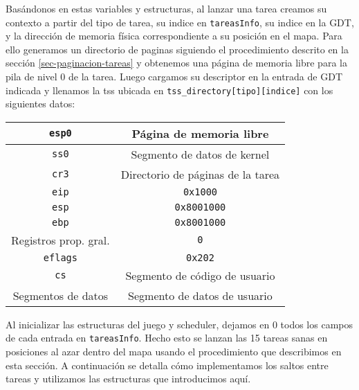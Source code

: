 Basándonos en estas variables y estructuras, al lanzar una tarea creamos su contexto a partir del tipo de tarea, su indice en \verb|tareasInfo|, su indice en la GDT, y la dirección de memoria física correspondiente a su posición en el mapa. 
Para ello generamos un directorio de paginas siguiendo el procedimiento descrito en la sección \ref{sec-paginacion-tareas} y obtenemos una página de memoria libre para la pila de nivel 0 de la tarea. Luego cargamos su descriptor en la entrada de GDT indicada y llenamos la tss ubicada en \verb|tss_directory[tipo][indice]| con los siguientes datos:\\


\begin{center}
	\begin{tabular}{ |c| c | }
		\hline
		\verb|esp0| & Página de memoria libre\\
		\hline
		\verb|ss0|  & Segmento de datos de kernel\\
		\hline
		\verb|cr3|  & Directorio de páginas de la tarea\\
		\hline
		\verb|eip|  & \verb|0x1000|\\
		\hline
		\verb|esp|  & \verb|0x8001000|\\
		\hline
		\verb|ebp|  & \verb|0x8001000|\\
		\hline
		Registros prop. gral. & \verb|0|\\
		\hline
		\verb|eflags| & \verb|0x202|\\
		\hline
		\verb|cs| & Segmento de código de usuario\\
		\hline
		Segmentos de datos & Segmento de datos de usuario\\
		\hline
	\end{tabular}
\end{center}


\label{sec:tss-tareasInfo-init}
Al inicializar las estructuras del juego y scheduler, dejamos en 0 todos los campos de cada entrada en \verb|tareasInfo|. Hecho esto se lanzan las 15 tareas sanas en posiciones al azar dentro del mapa usando el procedimiento que describimos en esta sección. A continuación se detalla cómo implementamos los saltos entre tareas y utilizamos las estructuras que introducimos aquí.






